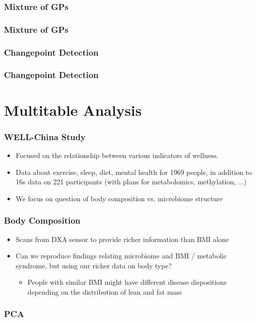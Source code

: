 \documentclass{beamer}
\begin{document}
\begin{frame}
  \frametitle{Mixture of GPs}
\end{frame}

\begin{frame}
  \frametitle{Mixture of GPs}
\end{frame}

\begin{frame}
  \frametitle{Changepoint Detection}
\end{frame}

\begin{frame}
  \frametitle{Changepoint Detection}
\end{frame}

\section{Multitable Analysis}
\label{sec:multitable analysis}

\begin{frame}
  \frametitle{WELL-China Study}
  \begin{itemize}
  \item Focused on the relationship between various indicators of wellness.
  \item Data about exercise, sleep, diet, mental health for 1969 people, in
    addition to 16s data on 221 participants (with plans for metabolomics,
    methylation, ...)
  \item We focus on question of body composition vs. microbiome structure
  \end{itemize}
\end{frame}

\begin{frame}
  \frametitle{Body Composition}
  \begin{itemize}
  \item Scans from DXA sensor to provide richer information than BMI alone
  \item Can we reproduce findings relating microbiome and BMI / metabolic
    syndrome, but using our richer data on body type?
    \begin{itemize}
    \item People with similar BMI might have different disease dispositions
      depending on the distribution of lean and fat mass
    \end{itemize}
  \end{itemize}  
\end{frame}

\begin{frame}
  \frametitle{PCA}
  
\end{frame}
\end{document}
